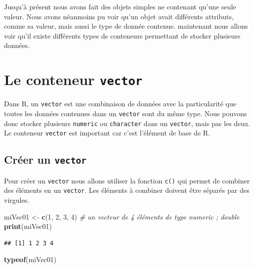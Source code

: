 \documentclass[]{book}
\newenvironment{Shaded}{\begin{snugshade}}{\end{snugshade}}
\newcommand{\CommentTok}[1]{\textcolor[rgb]{0.56,0.35,0.01}{\textit{#1}}}
\newcommand{\DecValTok}[1]{\textcolor[rgb]{0.00,0.00,0.81}{#1}}
\newcommand{\KeywordTok}[1]{\textcolor[rgb]{0.13,0.29,0.53}{\textbf{#1}}}
\newcommand{\NormalTok}[1]{#1}
\newcommand{\StringTok}[1]{\textcolor[rgb]{0.31,0.60,0.02}{#1}}
\begin{document}
Jusqu'à présent nous avons fait des objets simples ne contenant qu'une seule valeur. Nous avons néanmoins pu voir qu'un objet avait différents attributs, comme sa valeur, mais aussi le type de donnée contenue. maintenant nous allons voir qu'il existe différents types de conteneurs permettant de stocker plusieurs données.

\hypertarget{l014vector}{%
\section{\texorpdfstring{Le conteneur \texttt{vector}}{Le conteneur vector}}\label{l014vector}}

Dans R, un \texttt{vector} est une combinaison de données avec la particularité que toutes les données contenues dans un \texttt{vector} sont du même type. Nous pouvons donc stocker plusieurs \texttt{numeric} ou \texttt{character} dans un \texttt{vector}, mais pas les deux. Le conteneur \texttt{vector} est important car c'est l'élément de base de R.

\hypertarget{creer-un-vector}{%
\subsection{\texorpdfstring{Créer un \texttt{vector}}{Créer un vector}}\label{creer-un-vector}}

Pour créer un \texttt{vector} nous allons utiliser la fonction \texttt{c()} qui permet de combiner des éléments en un \texttt{vector}. Les éléments à combiner doivent être séparés par des virgules.

\begin{Shaded}
\begin{Highlighting}[]
\NormalTok{miVec01 <-}\StringTok{ }\KeywordTok{c}\NormalTok{(}\DecValTok{1}\NormalTok{, }\DecValTok{2}\NormalTok{, }\DecValTok{3}\NormalTok{, }\DecValTok{4}\NormalTok{) }\CommentTok{# un vecteur de 4 éléments de type numeric ; double}
\KeywordTok{print}\NormalTok{(miVec01)}
\end{Highlighting}
\end{Shaded}

\begin{verbatim}
## [1] 1 2 3 4
\end{verbatim}

\begin{Shaded}
\begin{Highlighting}[]
\KeywordTok{typeof}\NormalTok{(miVec01)}
\end{Highlighting}
\end{Shaded}
\end{document}
